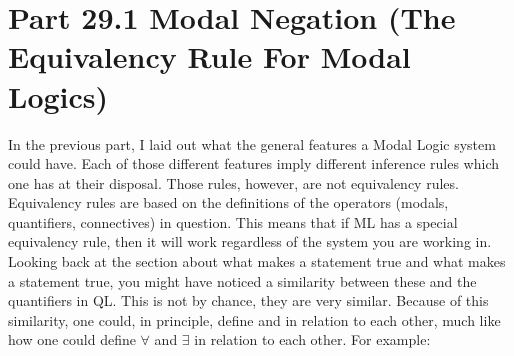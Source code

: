 \section{Part 29.1 Modal Negation (The Equivalency Rule For Modal Logics)}
In the previous part, I laid out what the general features a Modal Logic system could have. Each of those different features imply different inference rules which one has at their disposal. Those rules, however, are not equivalency rules. Equivalency rules are based on the definitions of the operators (modals, quantifiers, connectives) in question. This means that if ML has a special equivalency rule, then it will work regardless of the system you are working in. Looking back at the section about what makes a \ediamond  statement true and what makes a \ebox  statement true, you might have noticed a similarity between these and the quantifiers in QL. This is not by chance, they are very similar. Because of this similarity, one could, in principle, define \ebox  and \ediamond  in relation to each other, much like how one could define $\forall$  and $\exists$  in relation to each other. For example:

